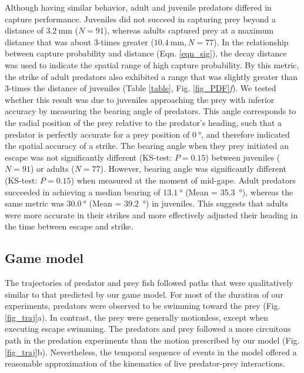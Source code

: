 \documentclass[]{rsos}%
\begin{document}
Although having similar behavior, adult and juvenile predators differed in capture performance.
Juveniles did not succeed in capturing prey beyond a distance of $\SI{3.2}{\mm}$ ($N = 91$), whereas adults captured prey at a maximum distance that was about 3-times greater ($\SI{10.4}{\mm}, N = 77$).
In the relationship between capture probability and distance (Eqn. \ref{eqn_sig}), the decay distance was used to indicate the spatial range of high capture probability. 
By this metric, the strike of adult predators also exhibited a range that was slightly greater than 3-times the distance of juveniles (Table \ref{table}, Fig. \ref{fig_PDF}\textit{f}).
We tested whether this result was due to juveniles approaching the prey with inferior accuracy by measuring the bearing angle of predators.
This angle corresponds to the radial position of the prey relative to the predator's heading, such that a predator is perfectly accurate for a prey position of $\SI{0}{\degree}$, and therefore indicated the spatial accuracy of a strike.
The bearing angle when they prey initiated an escape was not significantly different (KS-test: $P = 0.15$) between juveniles ($N = 91$) or adults ($N = 77$).
However, bearing angle was significantly different (KS-test: $P = 0.15$) when measured at the moment of mid-gape.
Adult predators succeeded in achieving a median bearing of $\SI{13.1}{\degree}$ (Mean = \SI{35.3}{\degree}), whereas the same metric was $\SI{30.0}{\degree}$ (Mean = \SI{39.2}{\degree}) in juveniles.
This suggests that adults were more accurate in their strikes and more effectively adjusted their heading in the time between escape and strike.


\subsection{Game model} %
The trajectories of predator and prey fish followed paths that were qualitatively similar to that predicted by our game model.
For most of the duration of our experiments, predators were observed to be swimming toward the prey (Fig. \ref{fig_traj}a). 
In contrast, the prey were generally motionless, except  when executing escape swimming.
The predators and prey followed a more circuitous path in the predation experiments than the motion prescribed by our model (Fig. \ref{fig_traj}b).
Nevertheless, the temporal sequence of events in the model offered a reasonable approximation of the kinematics of live predator-prey interactions.
\end{document}
